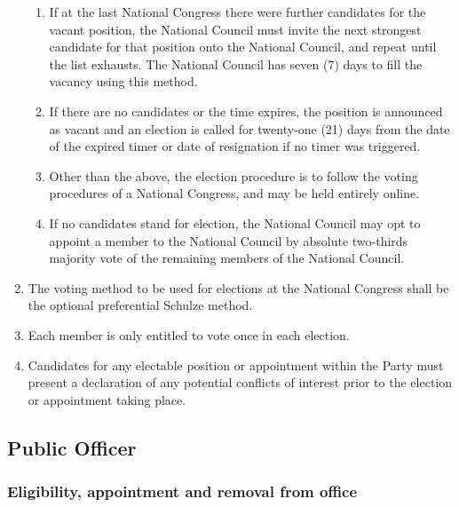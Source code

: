 \documentclass[a4paper,titlepage,8.5pt]{article}
\begin{document}
\begin{enumerate}
\begin{enumerate}
\item If at the last National Congress there were further candidates for the vacant position, the National Council must invite the next strongest candidate for that position onto the National Council, and repeat until the list exhausts. The National Council has seven (7) days to fill the vacancy using this method.
\item If there are no candidates or the time expires, the position is announced as vacant and an election is called for twenty-one (21) days from the date of the expired timer or date of resignation if no timer was triggered.
\item Other than the above, the election procedure is to follow the voting procedures of a National Congress, and may be held entirely online.
\item If no candidates stand for election, the National Council may opt to appoint a member to the National Council by absolute two-thirds majority vote of the remaining members of the National Council.
\end{enumerate}
\item The voting method to be used for elections at the National Congress shall be the optional preferential Schulze method.
\item Each member is only entitled to vote once in each election.
\item Candidates for any electable position or appointment within the Party must present a declaration of any potential conflicts of interest prior to the election or appointment taking place.
\end{enumerate}

\subsection{Public Officer}

\subsubsection{Eligibility, appointment and removal from office}
\end{document}
